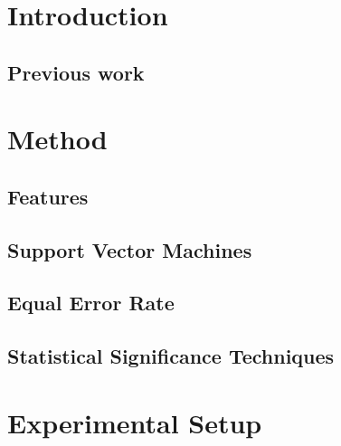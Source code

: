 \documentclass[11pt,a4paper]{tesis}
\begin{document}
\linespread{1.6}
  \def\titulo{Licenciado }

  \def\autor{Leandro Ariel Matayoshi}
  \def\tituloTesis{Pronunciation Scoring at Phone Level for Second Language Learning}
  \def\runtitulo{Pronunciation Scoring at Phone Level for Second Language Learning}
  \def\runtitle{Pronunciation Scoring at Phone Level for Second Language Learning}
  \def\director{Dra. Luciana Ferrer}
  \def\lugar{Buenos Aires, Octubre 2018}
	

	\tableofcontents
	\chapter{Introduction}
		
		\section{Previous work}
			
	\chapter{Method}
		
		\section{Features}
			
			
			
		\section{Support Vector Machines}
			
		\section{Equal Error Rate}
			
		\section{Statistical Significance Techniques}
			
			

	\chapter{Experimental Setup}
		
\end{document}

